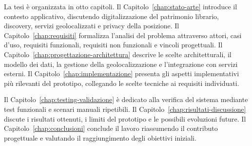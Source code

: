 La tesi è organizzata in otto capitoli. Il Capitolo~\ref{chap:stato-arte} introduce il contesto applicativo, discutendo digitalizzazione del patrimonio librario, discovery, servizi geolocalizzati e privacy della posizione. Il Capitolo~\ref{chap:requisiti} formalizza l'analisi del problema attraverso attori, casi d'uso, requisiti funzionali, requisiti non funzionali e vincoli progettuali. Il Capitolo~\ref{chap:progettazione-architettura} descrive le scelte architetturali, il modello dei dati, la gestione della geolocalizzazione e l'integrazione con servizi esterni. Il Capitolo~\ref{chap:implementazione} presenta gli aspetti implementativi più rilevanti del prototipo, collegando le scelte tecniche ai requisiti individuati.

Il Capitolo~\ref{chap:testing-validazione} è dedicato alla verifica del sistema mediante test funzionali e scenari manuali ripetibili. Il Capitolo~\ref{chap:risultati-discussione} discute i risultati ottenuti, i limiti del prototipo e le possibili evoluzioni future. Il Capitolo~\ref{chap:conclusioni} conclude il lavoro riassumendo il contributo progettuale e valutando il raggiungimento degli obiettivi iniziali.
